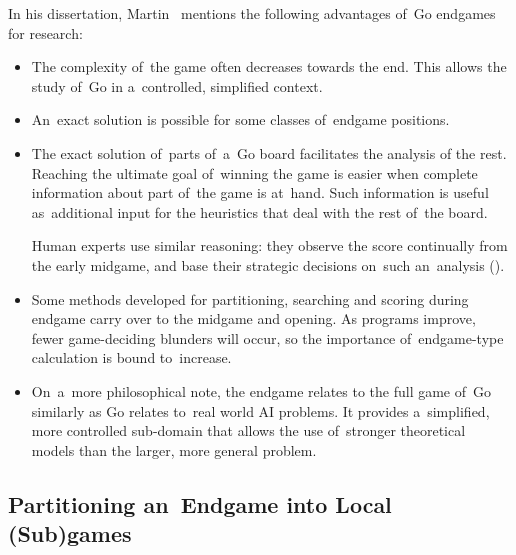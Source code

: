 In his dissertation, Martin~\Mueller{} mentions the following advantages of~Go endgames for research:
\begin{itemize}
  \item The complexity of~the game often decreases towards the end.
    This allows the study of~Go in a~controlled, simplified context.
  \item An~exact solution is possible for some classes of~endgame positions.
  \item The exact solution of~parts of~a~Go board facilitates the analysis of the rest.
    Reaching the ultimate goal of~winning the game is easier when complete information about part of~the game is at~hand.
    Such information is useful as~additional input for the heuristics that deal with the rest of~the board.

    Human experts use similar reasoning: they observe the score continually from the early midgame, and base their strategic decisions on~such an~analysis (\cite{Takagawa85}).
  \item Some methods developed for partitioning, searching and scoring during endgame carry over to the midgame and opening.
    As programs improve, fewer game-deciding blunders will occur, so the importance of~endgame-type calculation is bound to~increase.
  \item On~a~more philosophical note, the endgame relates to the full game of~Go similarly as Go relates to~real world AI problems.
    It provides a~simplified, more controlled sub-domain that allows the use of~stronger theoretical models than the larger, more general problem.
\end{itemize}

\subsection{Partitioning an~Endgame into Local (Sub)games}

